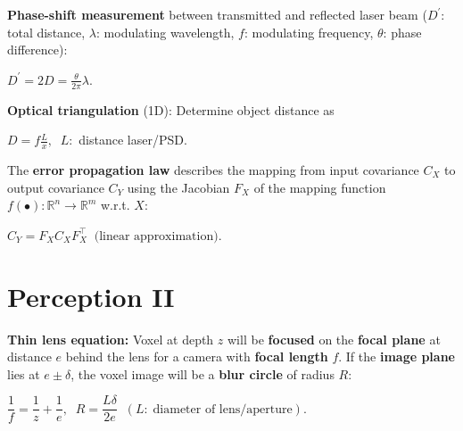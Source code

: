 \documentclass[landscape]{article}
\newcommand{\vmspace}{\vspace{-7pt}}
\newcommand{\vpspace}{\vspace{5pt}}
\newcommand{\vtspace}{\vspace{-10pt}}
\begin{document}
\begin{multicols}{3}
\vpspace

\begin{minipage}{\columnwidth}
  \textbf{Phase-shift measurement} between transmitted and reflected laser beam
  ($D^\prime$: total distance, $\lambda$: modulating wavelength, $f$:
  modulating frequency, $\theta$: phase difference):
  \begin{center}
    $
    D^\prime
    =
    2D
    =
    \frac{\theta}{2\pi}\lambda.
    $
  \end{center}
\end{minipage}

\vpspace

\begin{minipage}{\columnwidth}
  \textbf{Optical triangulation} (1D): Determine object distance as
  \begin{center}
    $
    D = f\frac{L}{x},\;\;L:
    $
    distance laser/PSD.
  \end{center}
\end{minipage}

\vpspace

\begin{minipage}{\columnwidth}
  The \textbf{error propagation law} describes the mapping from input covariance
  $C_X$ to output covariance $C_Y$ using the Jacobian $F_X$ of the mapping
  function $f(\bullet): \mathbb{R}^n \rightarrow \mathbb{R}^m$ w.r.t. $X$:
  \vmspace
  \begin{center}
    $C_Y=F_XC_XF_X^\intercal\;\;\text{(linear approximation)}.$
  \end{center}
\end{minipage}


\vtspace

\section{Perception II}

\vmspace

\begin{minipage}{\columnwidth}
  \textbf{Thin lens equation:} Voxel at depth $z$ will be \textbf{focused} on
  the \textbf{focal plane} at distance $e$ behind the lens for a camera with
  \textbf{focal length} $f$. If the \textbf{image plane} lies at $e \pm \delta$,
  the voxel image will be a \textbf{blur circle} of radius $R$:
  \vmspace
  \begin{center}
    $\dfrac{1}{f} = \dfrac{1}{z} + \dfrac{1}{e},\;\; R = \dfrac{L \delta}{2e}
    \;\;
    (L:\;\text{diameter of lens/aperture}).$
  \end{center}
\end{minipage}


\end{multicols}
\end{document}
